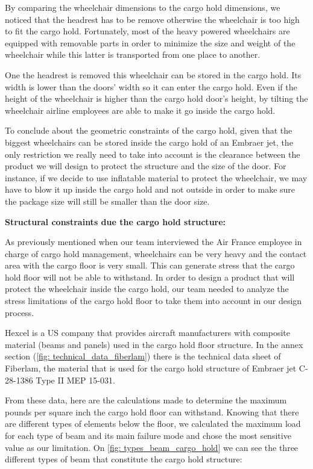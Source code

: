 By comparing the wheelchair dimensions to the cargo hold dimensions, we noticed that the headrest has to be remove otherwise the wheelchair is too high to fit the cargo hold. Fortunately, most of the heavy powered wheelchairs are equipped with removable parts in order to minimize the size and weight of the wheelchair while this latter is transported from one place to another.

One the headrest is removed this wheelchair can be stored in the cargo hold. Its width is lower than the doors’ width so it can enter the cargo hold. Even if the height of the wheelchair is higher than the cargo hold door’s height, by tilting the wheelchair airline employees are able to make it go inside the cargo hold.

To conclude about the geometric constraints of the cargo hold, given that the biggest wheelchairs can be stored inside the cargo hold of an Embraer jet, the only restriction we really need to take into account is the clearance between the product we will design to protect the structure and the size of the door. For instance, if we decide to use inflatable material to protect the wheelchair, we may have to blow it up inside the cargo hold and not outside in order to make sure the package size will still be smaller than the door size.

\textbf{Structural constraints due the cargo hold structure:}

As previously mentioned when our team interviewed the Air France employee in charge of cargo hold management, wheelchairs can be very heavy and the contact area with the cargo floor is very small. This can generate stress that the cargo hold floor will not be able to withstand. In order to design a product that will protect the wheelchair inside the cargo hold, our team needed to analyze the stress limitations of the cargo hold floor to take them into account in our design process.

Hexcel is a US company that provides aircraft manufacturers with composite material (beams and panels) used in the cargo hold floor structure. In the annex section (\ref{fig: technical_data_fiberlam}) there is the technical data sheet of Fiberlam, the material that is used for the cargo hold structure of Embraer jet C-28-1386 Type II MEP 15-031.

From these data, here are the calculations made to determine the maximum pounds per square inch the cargo hold floor can withstand. Knowing that there are different types of elements below the floor, we calculated the maximum load for each type of beam and its main failure mode and chose the most sensitive value as our limitation.
On \ref{fig: types_beam_cargo_hold} we can see the three different types of beam that constitute the cargo hold structure:

